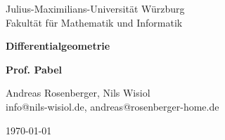 \begin{titlepage}
  Julius-Maximilians-Universität Würzburg\\
  Fakultät für Mathematik und Informatik
  
  \vspace{3cm}
  
  \begin{center}
   \LARGE\textbf{Differentialgeometrie}
  \end{center}
  
  \vspace{0cm}
  
  \begin{center}
   \huge\textbf{Prof. Pabel}
  \end{center}
  
  \vspace{1cm}
  
  \begin{center}
   \Large Andreas Rosenberger, Nils Wisiol \\
   \footnotesize info@nils-wisiol.de, andreas@rosenberger-home.de
  \end{center}
  
  \vspace{0cm}
  
  \begin{center}
   \Large \today
  \end{center}
  
  
\end{titlepage}
